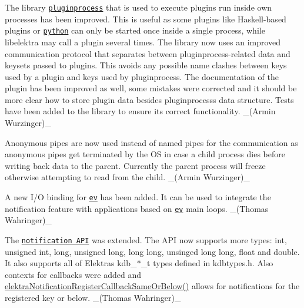 \begin{DoxyItemize}
\item The library \href{http://master.libelektra.org/src/libs/pluginprocess}{\tt {\ttfamily pluginprocess}} that is used to execute plugins run inside own processes has been improved. This is useful as some plugins like Haskell-\/based plugins or \href{http://libelektra.org/plugins/python}{\tt {\ttfamily python}} can only be started once inside a single process, while libelektra may call a plugin several times. The library now uses an improved communication protocol that separates between pluginprocess-\/related data and keysets passed to plugins. This avoids any possible name clashes between keys used by a plugin and keys used by pluginprocess. The documentation of the plugin has been improved as well, some mistakes were corrected and it should be more clear how to store plugin data besides pluginprocess\textquotesingle{}s data structure. Tests have been added to the library to ensure its correct functionality. \+\_\+(\+Armin Wurzinger)\+\_\+
\item Anonymous pipes are now used instead of named pipes for the communication as anonymous pipes get terminated by the OS in case a child process dies before writing back data to the parent. Currently the parent process will freeze otherwise attempting to read from the child. \+\_\+(\+Armin Wurzinger)\+\_\+
\end{DoxyItemize}


\begin{DoxyItemize}
\item A new I/O binding for \href{https://www.libelektra.org/bindings/io_ev}{\tt ev} has been added. It can be used to integrate the notification feature with applications based on \href{http://libev.schmorp.de}{\tt ev} main loops. \+\_\+(\+Thomas Wahringer)\+\_\+
\end{DoxyItemize}


\begin{DoxyItemize}
\item The \href{https://doc.libelektra.org/api/current/html/group__kdbnotification.html}{\tt notification A\+PI} was extended. The A\+PI now supports more types\+: {\ttfamily int}, {\ttfamily unsigned int}, {\ttfamily long}, {\ttfamily unsigned long}, {\ttfamily long long}, {\ttfamily unsinged long long}, {\ttfamily float} and {\ttfamily double}. It also supports all of Elektra\textquotesingle{}s {\ttfamily kdb\+\_\+$\ast$\+\_\+t} types defined in {\ttfamily kdbtypes.\+h}. Also contexts for callbacks were added and {\ttfamily \hyperlink{group__kdbnotification_ga374edd4f4fff527d6511ce4d0df62681}{elektra\+Notification\+Register\+Callback\+Same\+Or\+Below()}} allows for notifications for the registered key or below. \+\_\+(\+Thomas Wahringer)\+\_\+
\end{DoxyItemize}


